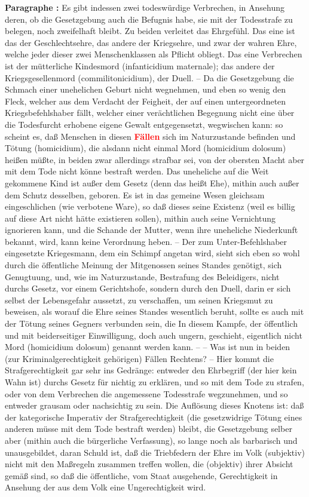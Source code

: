 \documentclass[a4paper,12pt,twoside]{book}
\newcommand{\match}[1]{\textcolor{red}{\textbf{#1}}}
\begin{document}
	\textbf{Paragraphe : }Es gibt indessen zwei todeswürdige Verbrechen, in Ansehung deren, ob die Gesetzgebung auch die Befugnis habe, sie mit der Todesstrafe zu belegen, noch zweifelhaft bleibt. Zu beiden verleitet das Ehrgefühl. Das eine ist das der Geschlechtsehre, das andere der Kriegsehre, und zwar der wahren Ehre, welche jeder dieser zwei Menschenklassen als Pflicht obliegt. Das eine Verbrechen ist der mütterliche Kindesmord (infanticidium maternale); das andere der Kriegsgesellenmord (commilitonicidium), der Duell. – Da die Gesetzgebung die Schmach einer unehelichen Geburt nicht wegnehmen, und eben so wenig den Fleck, welcher aus dem Verdacht der Feigheit, der auf einen untergeordneten Kriegsbefehlshaber fällt, welcher einer verächtlichen Begegnung nicht eine über die Todesfurcht erhobene eigene Gewalt entgegensetzt, wegwischen kann: so scheint es, daß Menschen in diesen \match{Fällen} sich im Naturzustande befinden und Tötung (homicidium), die alsdann nicht einmal Mord (homicidium dolosum) heißen müßte, in beiden zwar allerdings strafbar sei, von der obersten Macht aber mit dem Tode nicht könne bestraft werden. Das uneheliche auf die Weit gekommene Kind ist außer dem Gesetz (denn das heißt Ehe), mithin auch außer dem Schutz desselben, geboren. Es ist in das gemeine Wesen gleichsam eingeschlichen (wie verbotene Ware), so daß dieses seine Existenz (weil es billig auf diese Art nicht hätte existieren sollen), mithin auch seine Vernichtung ignorieren kann,  und die Schande der Mutter, wenn ihre uneheliche Niederkunft bekannt, wird, kann keine Verordnung heben. – Der zum Unter-Befehlshaber eingesetzte Kriegesmann, dem ein Schimpf angetan wird, sieht sich eben so wohl durch die öffentliche Meinung der Mitgenossen seines Standes genötigt, sich Genugtuung, und, wie im Naturzustande, Bestrafung des Beleidigers, nicht durchs Gesetz, vor einem Gerichtshofe, sondern durch den Duell, darin er sich selbst der Lebensgefahr aussetzt, zu verschaffen, um seinen Kriegsmut zu beweisen, als worauf die Ehre seines Standes wesentlich beruht, sollte es auch mit der Tötung seines Gegners verbunden sein, die In diesem Kampfe, der öffentlich und mit beiderseitiger Einwilligung, doch auch ungern, geschieht, eigentlich nicht Mord (homicidium dolosum) genannt werden kann. – – Was ist nun in beiden (zur Kriminalgerechtigkeit gehörigen) Fällen Rechtens? – Hier kommt die Strafgerechtigkeit gar sehr ins Gedränge: entweder den Ehrbegriff (der hier kein Wahn ist) durchs Gesetz für nichtig zu erklären, und so mit dem Tode zu strafen, oder von dem Verbrechen die angemessene Todesstrafe wegzunehmen, und so entweder grausam oder nachsichtig zu sein. Die Auflösung dieses Knotens ist: daß der kategorische Imperativ der Strafgerechtigkeit (die gesetzwidrige Tötung eines anderen müsse mit dem Tode bestraft werden) bleibt, die Gesetzgebung selber aber (mithin auch die bürgerliche Verfassung), so lange noch als barbarisch und unausgebildet, daran Schuld ist, daß die Triebfedern der Ehre im Volk (subjektiv) nicht mit den Maßregeln zusammen treffen wollen, die (objektiv) ihrer Absicht gemäß sind, so daß die öffentliche, vom Staat ausgehende, Gerechtigkeit in Ansehung der aus dem Volk eine Ungerechtigkeit wird. 
	
\end{document}
